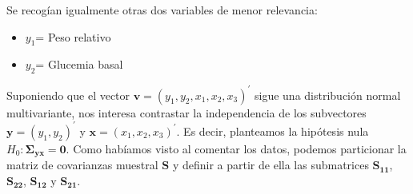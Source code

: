 \documentclass[
  a4paper,
  oneside]{scrbook}
\theoremstyle{definition}
\theoremstyle{definition}
\theoremstyle{definition}
\theoremstyle{definition}
\theoremstyle{remark}
\begin{document}
Se recogían igualmente otras dos variables de menor relevancia:

\begin{itemize}
\item
  \(y_1\)= Peso relativo
\item
  \(y_2\)= Glucemia basal
\end{itemize}

Suponiendo que el vector \(\bm{v}=(y_1,y_2,x_1,x_2,x_3)^\prime{}\) sigue
una distribución normal multivariante, nos interesa contrastar la
independencia de los subvectores \(\bm{y}=(y_1,y_2)^\prime{}\) y
\(\bm{x}=(x_1,x_2,x_3)^\prime\). Es decir, planteamos la hipótesis nula
\(H_0: \bm{\Sigma_{yx}}=\bm{0}\). Como habíamos visto al comentar los
datos, podemos particionar la matriz de covarianzas muestral \(\bm{S}\) y
definir a partir de ella las submatrices \(\bm{S_{11}}\), \(\bm{S_{22}}\),
\(\bm{S_{12}}\) y \(\bm{S_{21}}\).

\footnotesize
\end{document}
